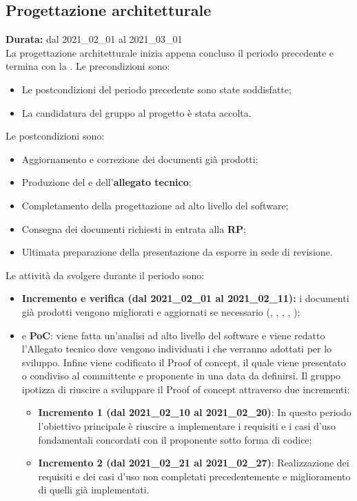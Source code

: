 \subsection{Progettazione architetturale}
\label{progettazione_architetturale}
\textbf{Durata:} dal 2021\_02\_01 al 2021\_03\_01\\
La progettazione architetturale inizia appena concluso il periodo precedente e termina con la .
Le precondizioni sono:
\begin{itemize}
    \item Le postcondizioni del periodo precedente sono state soddisfatte;
    \item La candidatura del gruppo al progetto {\NomeProgetto} è stata accolta.
\end{itemize}
Le postcondizioni sono:
\begin{itemize}
    \item Aggiornamento e correzione dei documenti già prodotti;
    \item Produzione del  e dell'\textbf{allegato tecnico};
    \item Completamento della progettazione ad alto livello del software;
    \item Consegna dei documenti richiesti in entrata alla \textbf{RP};
    \item Ultimata preparazione della presentazione da esporre in sede di revisione.
\end{itemize}
Le attività da svolgere durante il periodo sono:
\begin{itemize}
    \item \textbf{Incremento e verifica (dal 2021\_02\_01 al 2021\_02\_11):} i documenti già prodotti vengono migliorati e aggiornati se necessario ({\NdP}, {\PdP}, {\Glossario}, {\PdQ}, {\AdR});
    \item {} e \textbf{PoC}: viene fatta un'analisi ad alto livello del software e viene redatto l'Allegato tecnico dove vengono individuati i  che verranno adottati per lo sviluppo. Infine viene codificato il Proof of concept, il quale viene presentato o condiviso al committente e proponente in una data da definirsi. Il gruppo ipotizza di riuscire a sviluppare il Proof of concept attraverso due incrementi:
    \begin{itemize}
    	\item \textbf{Incremento 1 (dal 2021\_02\_10 al 2021\_02\_20)}: In questo periodo l'obiettivo principale è riuscire a implementare i requisiti e i casi d'uso fondamentali concordati con il proponente sotto forma di codice;
        \item \textbf{Incremento 2 (dal 2021\_02\_21 al 2021\_02\_27)}: Realizzazione dei requisiti e dei casi d'uso non completati precedentemente e miglioramento di quelli già implementati.
    \end{itemize}
\end{itemize}
\newpage

